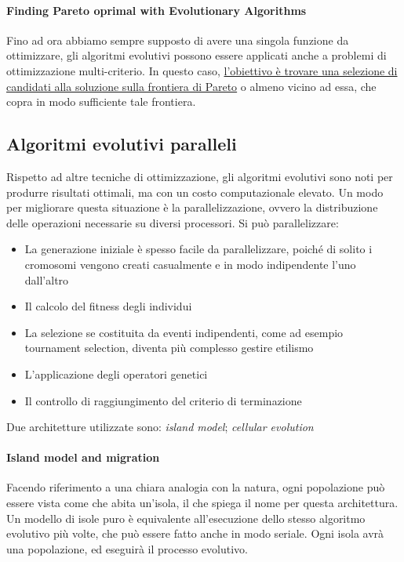 \paragraph{Finding Pareto oprimal with Evolutionary Algorithms}
Fino ad ora abbiamo sempre supposto di avere una singola funzione da ottimizzare, gli algoritmi evolutivi possono essere applicati anche a problemi di ottimizzazione multi-criterio. In questo caso, \uline{l'obiettivo è trovare una selezione di candidati alla soluzione sulla frontiera di Pareto} o almeno vicino ad essa, che copra in modo sufficiente tale frontiera.

\subsection{Algoritmi evolutivi paralleli}
Rispetto ad altre tecniche di ottimizzazione, gli algoritmi evolutivi sono noti per produrre risultati ottimali, ma con un costo computazionale elevato. Un modo per migliorare questa situazione è la parallelizzazione, ovvero la distribuzione delle operazioni necessarie su diversi processori. Si può parallelizzare:
\begin{itemize}
    \item La generazione iniziale è spesso facile da parallelizzare, poiché di solito i cromosomi vengono creati casualmente e in modo indipendente l'uno dall'altro
    \item Il calcolo del fitness degli individui
    \item La selezione se costituita da eventi indipendenti, come ad esempio tournament selection, diventa più complesso gestire etilismo
    \item L’applicazione degli operatori genetici
    \item Il controllo di raggiungimento del criterio di terminazione
\end{itemize}
Due architetture utilizzate sono: \textit{island model}; \textit{cellular evolution}

\paragraph{Island model and migration}
Facendo riferimento a una chiara analogia con la natura, ogni popolazione può essere vista come che abita un'isola, il che spiega il nome per questa architettura. Un modello di isole puro è equivalente all'esecuzione dello stesso algoritmo evolutivo più volte, che può essere fatto anche in modo seriale. Ogni isola avrà una popolazione, ed eseguirà il processo evolutivo. 

